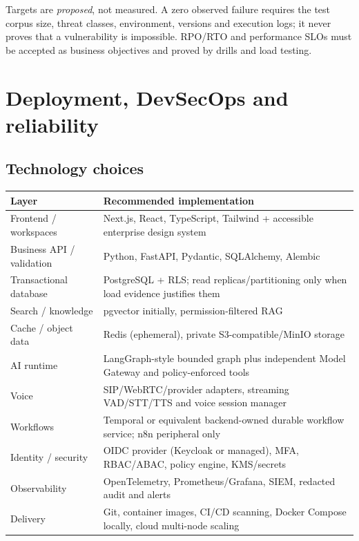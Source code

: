 \documentclass[10.5pt,a4paper,oneside]{article}
\begin{document}
Targets are \emph{proposed}, not measured. A zero observed failure requires the test corpus size, threat classes, environment, versions and execution logs; it never proves that a vulnerability is impossible. RPO/RTO and performance SLOs must be accepted as business objectives and proved by drills and load testing.

\section{Deployment, DevSecOps and reliability}
\subsection{Technology choices}
\begin{tabularx}{\textwidth}{@{}L{42mm}Y@{}}
\toprule{}\textbf{Layer} & \textbf{Recommended implementation}\\\midrule
Frontend / workspaces & Next.js, React, TypeScript, Tailwind + accessible enterprise design system\\
Business API / validation & Python, FastAPI, Pydantic, SQLAlchemy, Alembic\\
Transactional database & PostgreSQL + RLS; read replicas/partitioning only when load evidence justifies them\\
Search / knowledge & pgvector initially, permission-filtered RAG\\
Cache / object data & Redis (ephemeral), private S3-compatible/MinIO storage\\
AI runtime & LangGraph-style bounded graph plus independent Model Gateway and policy-enforced tools\\
Voice & SIP/WebRTC/provider adapters, streaming VAD/STT/TTS and voice session manager\\
Workflows & Temporal or equivalent backend-owned durable workflow service; n8n peripheral only\\
Identity / security & OIDC provider (Keycloak or managed), MFA, RBAC/ABAC, policy engine, KMS/secrets\\
Observability & OpenTelemetry, Prometheus/Grafana, SIEM, redacted audit and alerts\\
Delivery & Git, container images, CI/CD scanning, Docker Compose locally, cloud multi-node scaling\\
\bottomrule\end{tabularx}
\end{document}

